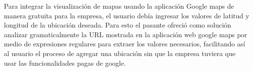 	Para integrar la visualización de mapas usando la aplicación Google maps de manera gratuita para la empresa, el usuario debía ingresar los valores de latitud y longitud de la ubicación deseada. Para esto el pasante ofreció como solución analizar gramaticalmente la URL mostrada en la aplicación web google maps por medio de expresiones regulares para extraer los valores necesarios, facilitando así al usuario el proceso de agregar una ubicación sin que la empresa tuviera que usar las funcionalidades pagas de google.





